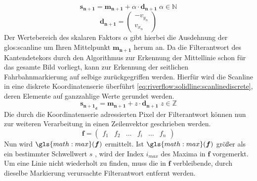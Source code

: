 \begin{equation}
\label{eq:riverflow:solidline:scanlinecontinous}
\boldsymbol{s_{n+1}} =
\boldsymbol{m_{n+1}}  + \alpha \cdot \boldsymbol{d_{n+1}}
\; \alpha \in \mathbb{N}
\end{equation}
\begin{equation}
\label{eq:riverflow:solidline:scanlinedirectionvec}
\boldsymbol{d_{n+1}} =
\begin{pmatrix}
-v_{y_n} \\
v_{x_n}
\end{pmatrix}
\end{equation}
Der Wertebereich des skalaren Faktors \begin{math} \alpha \end{math} gibt hierbei die Ausdehnung der \gls{glos:scanline} um Ihren Mittelpunkt \begin{math} \boldsymbol{m_{n+1}}  \end{math} herum an.
Da die Filterantwort des Kantendetekors durch den Algorithmus zur Erkennung der Mittellinie schon für das gesamte Bild vorliegt, kann zur Erkennung der seitlichen Fahrbahnmarkierung auf selbige zurückgegriffen werden. Hierfür wird die Scanline in eine diskrete Koordinatenserie überführt \ref{eq:riverflow:solidline:scanlinediscrete}, deren Elemente auf ganzzahlige Werte gerundet werden.
\begin{equation}
\label{eq:riverflow:solidline:scanlinediscrete}
\boldsymbol{s_{{n+1}_d}} =
\boldsymbol{m_{n+1}}  + z \cdot \boldsymbol{d_{n+1}} 
\; z \in \mathbb{Z}
\end{equation}
Die durch die Koordinatenserie adressierten Pixel der Filterantwort können nun zur weiteren Verarbeitung in einen Zeilenvektor geschrieben werden. 
 \begin{equation}
 \boldsymbol{f} =
 \begin{pmatrix}
 f_1 & f_2 &  \dots & f_i & \dots & f_n
 \end{pmatrix}
 \end{equation}
Nun wird  \begin{math} \gls{math:max}(\boldsymbol{f})  \end{math} ermittelt. Ist \begin{math} \gls{math:max}(\boldsymbol{f})  \end{math} größer als ein bestimmter Schwellwert \begin{math} s \end{math} , wird der Index \begin{math} i_{max} \end{math} des Maxima in \begin{math} \boldsymbol{f}  \end{math} vorgemerkt. Um eine Linie nicht wiederholt zu finden, muss die in \begin{math} \boldsymbol{f} \end{math} verbleibende, durch dieselbe Markierung verursachte Filterantwort entfernt  werden.
